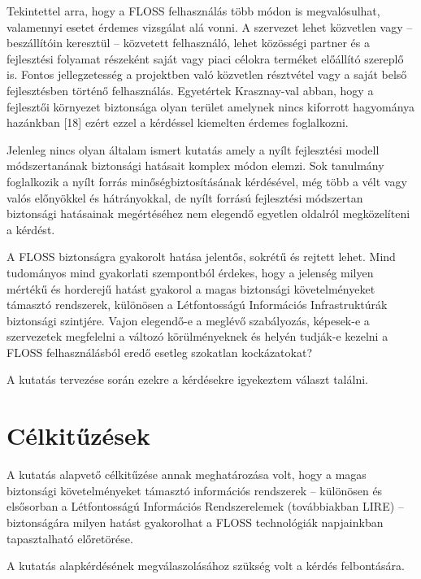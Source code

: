 \documentclass[12pt,magyar,a4paper,oneside]{scrreprt}
\begin{document}
Tekintettel arra, hogy a FLOSS felhasználás több módon is megvalósulhat,
valamennyi esetet érdemes vizsgálat alá vonni. A szervezet lehet
közvetlen vagy -- beszállítóin keresztül -- közvetett felhasználó, lehet
közösségi partner és a fejlesztési folyamat részeként saját vagy piaci
célokra terméket előállító szereplő is. Fontos jellegzetesség a
projektben való közvetlen résztvétel vagy a saját belső fejlesztésben
történő felhasználás. Egyetértek Krasznay-val abban, hogy a fejlesztői
környezet biztonsága olyan terület amelynek nincs kiforrott hagyománya
hazánkban {[}18{]} ezért ezzel a kérdéssel kiemelten érdemes
foglalkozni.

Jelenleg nincs olyan általam ismert kutatás amely a nyílt fejlesztési
modell módszertanának biztonsági hatásait komplex módon elemzi. Sok
tanulmány foglalkozik a nyílt forrás minőségbiztosításának kérdésével,
még több a vélt vagy valós előnyökkel és hátrányokkal, de nyílt forrású
fejlesztési módszertan biztonsági hatásainak megértéséhez nem elegendő
egyetlen oldalról megközelíteni a kérdést.

A FLOSS biztonságra gyakorolt hatása jelentős, sokrétű és rejtett lehet.
Mind tudományos mind gyakorlati szempontból érdekes, hogy a jelenség
milyen mértékű és horderejű hatást gyakorol a magas biztonsági
követelményeket támasztó rendszerek, különösen a Létfontosságú
Információs Infrastruktúrák biztonsági szintjére. Vajon elegendő-e a
meglévő szabályozás, képesek-e a szervezetek megfelelni a változó
körülményeknek és helyén tudják-e kezelni a FLOSS felhasználásból eredő
esetleg szokatlan kockázatokat?

A kutatás tervezése során ezekre a kérdésekre igyekeztem választ
találni.

\hypertarget{sec:CELKITUZESEK}{%
\section{Célkitűzések}\label{sec:CELKITUZESEK}}

A kutatás alapvető célkitűzése annak meghatározása volt, hogy a magas
biztonsági követelményeket támasztó információs rendszerek -- különösen
és elsősorban a Létfontosságú Információs Rendszerelemek (továbbiakban
LIRE) -- biztonságára milyen hatást gyakorolhat a FLOSS technológiák
napjainkban tapasztalható előretörése.

A kutatás alapkérdésének megválaszolásához szükség volt a kérdés
felbontására.
\end{document}
